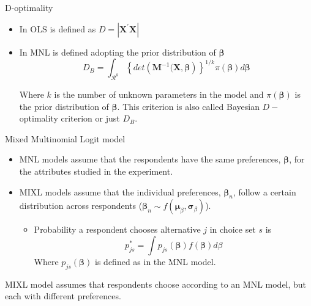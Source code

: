 \documentclass[11pt,t]{beamer}
\begin{document}
\begin{frame}[fragile]{D-optimality}
	\begin{itemize}
		\item In OLS is defined as $D = |\mathbf{X}^{'}\mathbf{X}|$
		\item In MNL is defined adopting the prior distribution of $\pmb{\beta}$
		$$D_B = \int_{\mathcal{R}^k} \left\{det\left(\mathbf{M}^{-1}(\mathbf{X},\pmb{\beta}\right)\right\}^{1/k}\pi(\pmb{\beta})d\pmb{\beta}$$

Where $k$ is the number of unknown parameters in the model and $\pi(\pmb{\beta})$ is the prior distribution of $\pmb{\beta}$. This criterion is also called Bayesian $D-$optimality criterion or just $D_B$.
	\end{itemize}
\end{frame}

\begin{frame}[fragile]{Mixed Multinomial Logit model}
	\begin{itemize}
		\item MNL models assume that the respondents have the same preferences, $\pmb{\beta}$, for the attributes studied in the experiment.
		\item MIXL models assume that the individual preferences, $\pmb{\beta}_n$, follow a certain distribution across respondents ($\pmb{\beta}_n \sim f(\pmb{\mu}_\beta,\pmb{\sigma}_\beta)$).
		\begin{itemize}
			\item Probability a respondent chooses alternative $j$ in choice set $s$ is \\
			\vspace*{-3mm}
			$$p^{*}_{js}=\int p_{js}(\pmb{\beta})f(\pmb{\beta}) d\beta $$
			Where $p_{js}(\pmb{\beta})$ is defined as in the MNL model.
		\end{itemize}
	\end{itemize}
	\begin{block}{}
	MIXL model assumes that respondents choose according to an MNL model, but each with different preferences.
	\end{block}
\end{frame}
\end{document}
